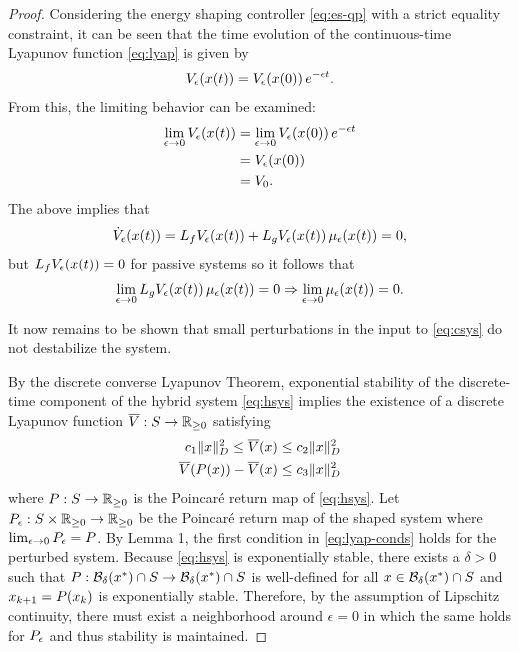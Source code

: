 \documentclass[twocolumn]{article}
\begin{document}
\begin{proof}
  Considering the energy shaping controller \eqref{eq:es-qp} with a strict equality constraint, it can be seen that the time evolution of the continuous-time Lyapunov function \eqref{eq:lyap} is given by
  \begin{align*}
    \Ve(x(t)) = \Ve(x(0)) \, e^{-\epsilon t}.
  \end{align*}
  From this, the limiting behavior can be examined:
  \begin{align*}
    \limeps \Ve(x(t)) &= \limeps \Ve(x(0)) \, e^{-\epsilon t}\\
    &= \Ve(x(0))\\
    &= V_0.
  \end{align*}
  The above implies that
  \begin{align*}
    \dVe(x(t)) = L_{f} \Ve(x(t)) + L_{g} \Ve(x(t)) \, \mu_{\epsilon}(x(t)) = 0,
  \end{align*}
  but $L_{f} \Ve(x(t)) = 0$ for passive systems so it follows that
  \begin{align*}
    \limeps L_{g} \Ve(x(t)) \, \mu_{\epsilon}(x(t)) = 0 \Rightarrow \limeps \mu_{\epsilon}(x(t)) = 0.
  \end{align*}

  It now remains to be shown that small perturbations in the input to \eqref{eq:csys} do not destabilize the system.

  By the discrete converse Lyapunov Theorem, exponential stability of the discrete-time component of the hybrid system \eqref{eq:hsys} implies the existence of a discrete Lyapunov function $\Vbar : \S \to \Rnn$ satisfying
  \begin{align}
    \label{eq:lyap-conds}
    c_{1} \| x \|^{2}_{\D} \leq \Vbar(x) \leq c_{2} \| x \|_{\D}^2\\
    \nonumber
    \Vbar(\P(x)) - \Vbar(x) \leq c_{3} \| x \|^{2}_{\D}
  \end{align}
where $\P : S \to \Rnn$ is the Poincar{\'e} return map of \eqref{eq:hsys}.
%
Let $\Pe : \S \times \Rnn \to \Rnn$ be the Poincar{\'e} return map of the shaped system where $\limeps \Pe = \P$.
%
By Lemma 1, the first condition in \eqref{eq:lyap-conds} holds for the perturbed system.
%
Because \eqref{eq:hsys} is exponentially stable, there exists a $\delta > 0$ such that $\P : \B_{\delta}(\xst) \cap \S \to \B_{\delta}(\xst) \cap \S$ is well-defined for all $x \in \B_{\delta}(\xst) \cap \S$ and $x_{k+1} = \P(x_{k})$ is exponentially stable.
%
Therefore, by the assumption of Lipschitz continuity, there must exist a neighborhood around $\epsilon = 0$ in which the same holds for $\Pe$ and thus stability is maintained.
\end{proof}
\end{document}

